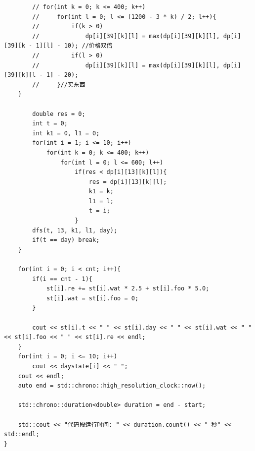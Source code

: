 \begin{verbatim}
        // for(int k = 0; k <= 400; k++)   
        //     for(int l = 0; l <= (1200 - 3 * k) / 2; l++){
        //         if(k > 0)
        //             dp[i][39][k][l] = max(dp[i][39][k][l], dp[i][39][k - 1][l] - 10); //价格双倍
        //         if(l > 0)
        //             dp[i][39][k][l] = max(dp[i][39][k][l], dp[i][39][k][l - 1] - 20);
        //     }//买东西
    }

        double res = 0;
        int t = 0;
        int k1 = 0, l1 = 0;
        for(int i = 1; i <= 10; i++)
            for(int k = 0; k <= 400; k++)
                for(int l = 0; l <= 600; l++)
                    if(res < dp[i][13][k][l]){
                        res = dp[i][13][k][l];
                        k1 = k;
                        l1 = l;
                        t = i;
                    }
        dfs(t, 13, k1, l1, day);
        if(t == day) break;
    }
    
    for(int i = 0; i < cnt; i++){
        if(i == cnt - 1){
            st[i].re += st[i].wat * 2.5 + st[i].foo * 5.0;
            st[i].wat = st[i].foo = 0;
        }

        cout << st[i].t << " " << st[i].day << " " << st[i].wat << " " << st[i].foo << " " << st[i].re << endl;
    }
    for(int i = 0; i <= 10; i++)
        cout << daystate[i] << " ";
    cout << endl;
    auto end = std::chrono::high_resolution_clock::now();

    std::chrono::duration<double> duration = end - start;

    std::cout << "代码段运行时间: " << duration.count() << " 秒" << std::endl;
}
\end{verbatim}

